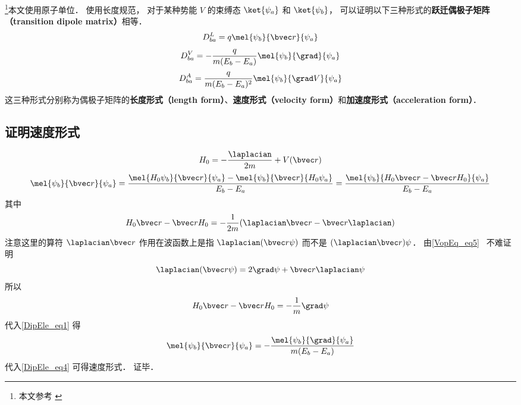 

\footnote{本文参考 \cite{Brandsen}}本文使用原子单位． 使用长度规范， 对于某种势能 $V$ 的束缚态 $\ket{\psi_a}$ 和 $\ket{\psi_b}$， 可以证明以下三种形式的\textbf{跃迁偶极子矩阵（transition dipole matrix）}相等．
\begin{equation}\label{DipEle_eq4}
D_{ba}^L = q\mel{\psi_b}{\bvec r}{\psi_a}
\end{equation}
\begin{equation}\label{DipEle_eq3}
D_{ba}^V = -\frac{q}{m(E_b - E_a)}\mel{\psi_b}{\grad}{\psi_a}
\end{equation}
\begin{equation}
D_{ba}^A = \frac{q}{m(E_b-E_a)^2} \mel{\psi_b}{\grad V}{\psi_a}
\end{equation}
这三种形式分别称为偶极子矩阵的\textbf{长度形式（length form）}、\textbf{速度形式（velocity form）}和\textbf{加速度形式（acceleration form）}．

\subsection{证明速度形式}
\begin{equation}
H_0 = -\frac{\laplacian}{2m} + V(\bvec r)
\end{equation}
\begin{equation}\label{DipEle_eq1}
\mel{\psi_b}{\bvec r}{\psi_a} = \frac{\mel{H_0\psi_b}{\bvec r}{\psi_a} - \mel{\psi_b}{\bvec r}{H_0\psi_a}}{E_b - E_a} = \frac{\mel{\psi_b}{H_0\bvec r - \bvec rH_0}{\psi_a}}{E_b - E_a}
\end{equation}
其中
\begin{equation}
H_0\bvec r - \bvec rH_0 = -\frac{1}{2m}(\laplacian \bvec r - \bvec r \laplacian)
\end{equation}
注意这里的算符 $\laplacian \bvec r$ 作用在波函数上是指 $\laplacian (\bvec r \psi)$ 而不是 $(\laplacian \bvec r) \psi$． 由\autoref{VopEq_eq5}~ 不难证明
\begin{equation}
\laplacian (\bvec r \psi) = 2 \grad \psi + \bvec r \laplacian \psi
\end{equation}
所以
\begin{equation}
H_0\bvec r - \bvec rH_0 = -\frac{1}{m}\grad \psi
\end{equation}
代入\autoref{DipEle_eq1} 得
\begin{equation}
\mel{\psi_b}{\bvec r}{\psi_a} = -\frac{\mel{\psi_b}{\grad}{\psi_a}}{m(E_b - E_a)}
\end{equation}
代入\autoref{DipEle_eq4} 可得速度形式． 证毕．

